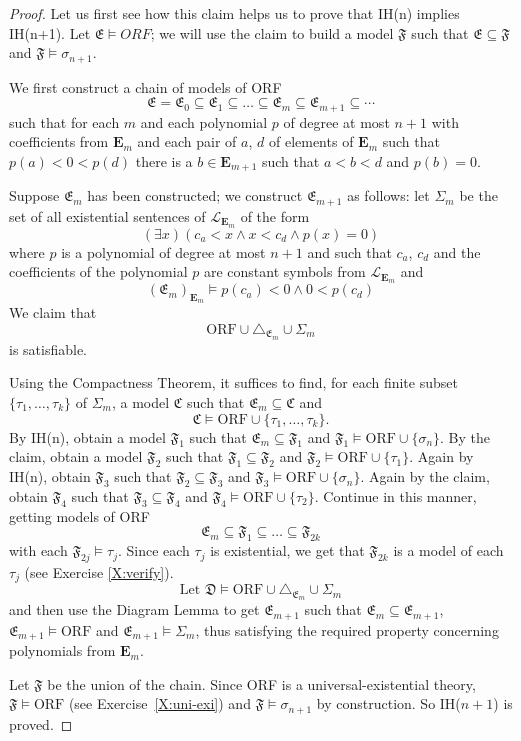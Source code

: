 \documentclass[titlepage, oneside]{amsbook}
\theoremstyle{plain}
\theoremstyle{definition}
\theoremstyle{remark}
\newcommand{\lan}{\ensuremath{\mathcal{L}}}
\newcommand{\seq}{\ensuremath{\subseteq}}
\newcommand{\mc}{\ensuremath{\mathfrak{C}}}
\newcommand{\md}{\ensuremath{\mathfrak{D}}}
\newcommand{\me}{\ensuremath{\mathfrak{E}}}
\newcommand{\mf}{\ensuremath{\mathfrak{F}}}
\newcommand{\be}{\ensuremath{\mathbf{E}}}
\begin{document}
\begin{proof}
Let us first see how this claim helps us to prove that IH(n) implies
IH(n+1). Let $\me \models ORF$; we will use the claim to build a model
$\mf$ such that $\me \seq \mf$ and $\mf \models \sigma_{n+1}$.

We first construct a chain of models of ORF \[ \me = \me_0 \seq \me_1
\seq \dots \seq \me_m \seq \me_{m+1} \seq \cdots \] such that for each
$m$ and each polynomial $p$ of degree at most $n+1$ with coefficients
from $\be_m$ and each pair of $a$, $d$ of elements of $\be_m$ such that
$p(a) < 0 < p(d)$ there is a $b \in \be_{m+1}$ such that $a < b < d $
and $p(b) = 0$.


Suppose $\me_m$ has been constructed; we construct $\me_{m+1}$ as
follows:  let $\Sigma_m$ be the set of all existential sentences of
$\lan_{\be_m}$ of the form \[ (\exists x ) ( c_a < x \wedge x < c_d
\wedge p (x ) = 0 ) \] where $p$ is a polynomial of degree at most
$n+1$ and such that  $c_a$, $c_d$ and the coefficients of the
polynomial $p$ are constant symbols from $\lan_{\be_m}$ and
\[(\me_m)_{\be_m} \models p (c_a) < 0 \wedge 0 < p(c_d)\] We claim that
\[ \mbox{ORF} \cup \triangle_{\me_m} \cup \Sigma_m \] is satisfiable.

Using the Compactness Theorem, it suffices to find, for each finite
subset $\{ \tau_1 , \dots , \tau_k \}$ of $\Sigma_m$, a model $\mc$
such that $\me_m \seq \mc$ and \[ \mc \models \mbox{ORF} \cup \{ \tau_1
, \dots , \tau_k \} . \]
By IH(n), obtain a model $\mf_1$ such that $\me_m \seq \mf_1$ and
$\mf_1 \models \mbox{ORF} \cup \{ \sigma_n \} $.  By the claim, obtain
a model $\mf_2$ such that $\mf_1 \seq \mf_2$ and $\mf_2 \models
\mbox{ORF} \cup \{ \tau_1 \} $.  Again by IH(n), obtain $\mf_3$ such
that $\mf_2 \seq \mf_3$ and $\mf_3 \models \mbox{ORF} \cup \{ \sigma_n
\}$.  Again by the claim, obtain $\mf_4$ such that $\mf_3 \seq \mf_4$
and $\mf_4 \models \mbox{ORF} \cup \{ \tau_2 \}$.  Continue in this
manner, getting models of ORF \[ \me_m \seq \mf_1 \seq \dots \seq
\mf_{2k} \] with each $\mf_{2j} \models \tau_j$.  Since each $\tau_j$
is existential, we get that $\mf_{2k}$ is a model of each $\tau_j$ (see
Exercise \ref{X:verify}).
 \[\mbox{Let } \md \models \mbox{ORF} \cup \triangle_{\me_m} \cup
\Sigma_m \]
and then use the Diagram Lemma to get $\me_{m+1}$ such that $\me_m \seq
\me_{m+1}$, $\me_{m+1} \models \mbox{ORF}$ and $\me_{m+1} \models
\Sigma_m$, thus satisfying the required property concerning polynomials
from $\be_m$.

Let $\mf$ be the union of the chain.  Since ORF is a
universal-existential theory, $\mf \models \mbox{ORF}$ (see
Exercise~\ref{X:uni-exi}) and $\mf \models \sigma_{n+1}$ by
construction.
So IH($n+1$) is proved.


\end{proof}
\end{document}
